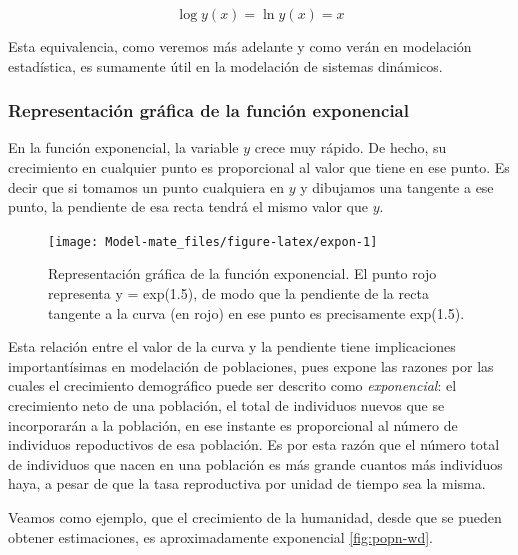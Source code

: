 \documentclass[
]{book}
\begin{document}
\[\log y(x) = \ln y(x) = x\]

Esta equivalencia, como veremos más adelante y como verán en modelación estadística, es sumamente útil en la modelación de sistemas dinámicos.

\hypertarget{representaciuxf3n-gruxe1fica-de-la-funciuxf3n-exponencial}{%
\subsubsection{Representación gráfica de la función exponencial}\label{representaciuxf3n-gruxe1fica-de-la-funciuxf3n-exponencial}}

En la función exponencial, la variable \(y\) crece muy rápido. De hecho, su crecimiento en cualquier punto es proporcional al valor que tiene en ese punto. Es decir que si tomamos un punto cualquiera en \(y\) y dibujamos una tangente a ese punto, la pendiente de esa recta tendrá el mismo valor que \(y\).

\begin{figure}

{\centering \texttt{[image: Model-mate\_files/figure-latex/expon-1]} 

}

\caption{Representación gráfica de la función exponencial. El punto rojo representa y = exp(1.5), de modo que la pendiente de la recta tangente a la curva (en rojo) en ese punto es precisamente exp(1.5).}\label{fig:expon}
\end{figure}

Esta relación entre el valor de la curva y la pendiente tiene implicaciones importantísimas en modelación de poblaciones, pues expone las razones por las cuales el crecimiento demográfico puede ser descrito como \emph{exponencial}: el crecimiento neto de una población, el total de individuos nuevos que se incorporarán a la población, en ese instante es proporcional al número de individuos repoductivos de esa población. Es por esta razón que el número total de individuos que nacen en una población es más grande cuantos más individuos haya, a pesar de que la tasa reproductiva por unidad de tiempo sea la misma.

Veamos como ejemplo, que el crecimiento de la humanidad, desde que se pueden obtener estimaciones, es aproximadamente exponencial \ref{fig:popn-wd}.
\end{document}
